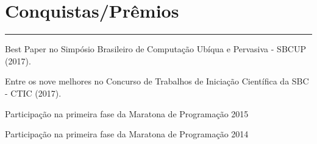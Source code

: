 \documentclass[]{rahulworld-resume}
\begin{document}
\begin{minipage}[t]{0.66\textwidth}
\section{Conquistas/Prêmios} 
\noindent\rule{12.5cm}{0.4pt}
 
\noindent
\hspace{5em}%
\begin{minipage}{0.85\textwidth\vspace{2pt}}
Best Paper no Simpósio Brasileiro de Computação Ubíqua e Pervasiva - SBCUP (2017).
\end{minipage}
 
\noindent
\hspace{5em}%
\begin{minipage}{0.85\textwidth\vspace{2pt}}
Entre os nove melhores no Concurso de Trabalhos de Iniciação Científica da SBC - CTIC (2017).
\end{minipage}
 
\noindent
\hspace{5em}%
\begin{minipage}{0.85\textwidth\vspace{2pt}}
Participação na primeira fase da Maratona de Programação 2015
\end{minipage}
 
\noindent
\hspace{5em}%
\begin{minipage}{0.85\textwidth\vspace{2pt}}
Participação na primeira fase da Maratona de Programação 2014
\end{minipage}

\end{minipage}
\end{document}
